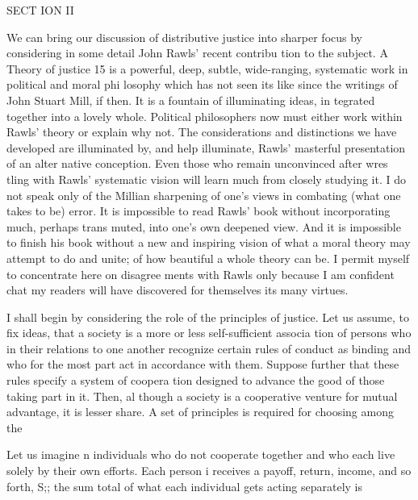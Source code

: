 \documentclass[11pt,openany]{book}
\begin{document}
SECT ION II 

We can bring our discussion of distributive justice into sharper focus by considering in some detail John Rawls' recent contribu tion to the subject. A Theory of justice 15 is a powerful, deep, subtle, wide-ranging, systematic work in political and moral phi losophy which has not seen its like since the writings of John Stuart Mill, if then. It is a fountain of illuminating ideas, in tegrated together into a lovely whole. Political philosophers now must either work within Rawls' theory or explain why not. The considerations and distinctions we have developed are illuminated by, and help illuminate, Rawls' masterful presentation of an alter native conception. Even those who remain unconvinced after wres tling with Rawls' systematic vision will learn much from closely studying it. I do not speak only of the Millian sharpening of one's views in combating (what one takes to be) error. It is impossible to read Rawls' book without incorporating much, perhaps trans muted, into one's own deepened view. And it is impossible to finish his book without a new and inspiring vision of what a moral theory may attempt to do and unite; of how beautiful a whole theory can be. I permit myself to concentrate here on disagree ments with Rawls only because I am confident chat my readers will have discovered for themselves its many virtues. 

I shall begin by considering the role of the principles of justice. Let us assume, to fix ideas, that a society is a more or less self-sufficient associa tion of persons who in their relations to one another recognize certain rules of conduct as binding and who for the most part act in accordance with them. Suppose further that these rules specify a system of coopera tion designed to advance the good of those taking part in it. Then, al though a society is a cooperative venture for mutual advantage, it is lesser share. A set of principles is required for choosing among the 

Let us imagine n individuals who do not cooperate together and who each live solely by their own efforts. Each person i receives a payoff, return, income, and so forth, S;; the sum total of what each individual gets acting separately is 
\end{document}
